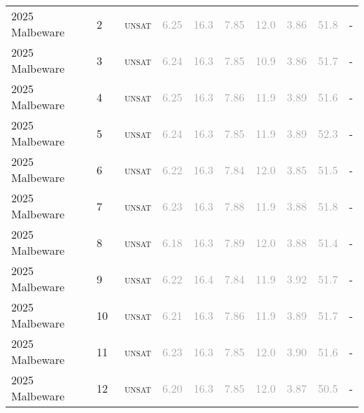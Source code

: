 \begin{center}
{\begin{longtable}{@{}llllllllll@{}}
2025 Malbeware & 2 & ~\textsc{unsat} & \textcolor{darkgray}{6.25} & \textcolor{darkgray}{16.3} & \textcolor{darkgray}{7.85} & \textcolor{darkgray}{12.0} & \textcolor{darkgray}{3.86} & \textcolor{darkgray}{51.8} & - \\
2025 Malbeware & 3 & ~\textsc{unsat} & \textcolor{darkgray}{6.24} & \textcolor{darkgray}{16.3} & \textcolor{darkgray}{7.85} & \textcolor{darkgray}{10.9} & \textcolor{darkgray}{3.86} & \textcolor{darkgray}{51.7} & - \\
2025 Malbeware & 4 & ~\textsc{unsat} & \textcolor{darkgray}{6.25} & \textcolor{darkgray}{16.3} & \textcolor{darkgray}{7.86} & \textcolor{darkgray}{11.9} & \textcolor{darkgray}{3.89} & \textcolor{darkgray}{51.6} & - \\
2025 Malbeware & 5 & ~\textsc{unsat} & \textcolor{darkgray}{6.24} & \textcolor{darkgray}{16.3} & \textcolor{darkgray}{7.85} & \textcolor{darkgray}{11.9} & \textcolor{darkgray}{3.89} & \textcolor{darkgray}{52.3} & - \\
2025 Malbeware & 6 & ~\textsc{unsat} & \textcolor{darkgray}{6.22} & \textcolor{darkgray}{16.3} & \textcolor{darkgray}{7.84} & \textcolor{darkgray}{12.0} & \textcolor{darkgray}{3.85} & \textcolor{darkgray}{51.5} & - \\
2025 Malbeware & 7 & ~\textsc{unsat} & \textcolor{darkgray}{6.23} & \textcolor{darkgray}{16.3} & \textcolor{darkgray}{7.88} & \textcolor{darkgray}{11.9} & \textcolor{darkgray}{3.88} & \textcolor{darkgray}{51.8} & - \\
2025 Malbeware & 8 & ~\textsc{unsat} & \textcolor{darkgray}{6.18} & \textcolor{darkgray}{16.3} & \textcolor{darkgray}{7.89} & \textcolor{darkgray}{12.0} & \textcolor{darkgray}{3.88} & \textcolor{darkgray}{51.4} & - \\
2025 Malbeware & 9 & ~\textsc{unsat} & \textcolor{darkgray}{6.22} & \textcolor{darkgray}{16.4} & \textcolor{darkgray}{7.84} & \textcolor{darkgray}{11.9} & \textcolor{darkgray}{3.92} & \textcolor{darkgray}{51.7} & - \\
2025 Malbeware & 10 & ~\textsc{unsat} & \textcolor{darkgray}{6.21} & \textcolor{darkgray}{16.3} & \textcolor{darkgray}{7.86} & \textcolor{darkgray}{11.9} & \textcolor{darkgray}{3.89} & \textcolor{darkgray}{51.7} & - \\
2025 Malbeware & 11 & ~\textsc{unsat} & \textcolor{darkgray}{6.23} & \textcolor{darkgray}{16.3} & \textcolor{darkgray}{7.85} & \textcolor{darkgray}{12.0} & \textcolor{darkgray}{3.90} & \textcolor{darkgray}{51.6} & - \\
2025 Malbeware & 12 & ~\textsc{unsat} & \textcolor{darkgray}{6.20} & \textcolor{darkgray}{16.3} & \textcolor{darkgray}{7.85} & \textcolor{darkgray}{12.0} & \textcolor{darkgray}{3.87} & \textcolor{darkgray}{50.5} & - \\

\end{longtable}}
\end{center}
